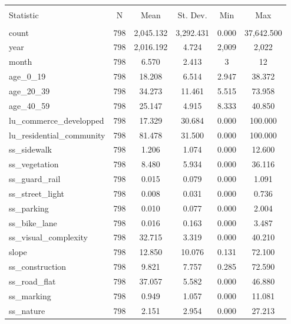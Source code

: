 
\begin{table}[!htbp] \centering 
  \caption{} 
  \label{} 
\begin{tabular}{@{\extracolsep{5pt}}lccccc} 
\\[-1.8ex]\hline 
\hline \\[-1.8ex] 
Statistic & \multicolumn{1}{c}{N} & \multicolumn{1}{c}{Mean} & \multicolumn{1}{c}{St. Dev.} & \multicolumn{1}{c}{Min} & \multicolumn{1}{c}{Max} \\ 
\hline \\[-1.8ex] 
count & 798 & 2,045.132 & 3,292.431 & 0.000 & 37,642.500 \\ 
year & 798 & 2,016.192 & 4.724 & 2,009 & 2,022 \\ 
month & 798 & 6.570 & 2.413 & 3 & 12 \\ 
age\_0\_19 & 798 & 18.208 & 6.514 & 2.947 & 38.372 \\ 
age\_20\_39 & 798 & 34.273 & 11.461 & 5.515 & 73.958 \\ 
age\_40\_59 & 798 & 25.147 & 4.915 & 8.333 & 40.850 \\ 
lu\_commerce\_developped & 798 & 17.329 & 30.684 & 0.000 & 100.000 \\ 
lu\_residential\_community & 798 & 81.478 & 31.500 & 0.000 & 100.000 \\ 
ss\_sidewalk & 798 & 1.206 & 1.074 & 0.000 & 12.600 \\ 
ss\_vegetation & 798 & 8.480 & 5.934 & 0.000 & 36.116 \\ 
ss\_guard\_rail & 798 & 0.015 & 0.079 & 0.000 & 1.091 \\ 
ss\_street\_light & 798 & 0.008 & 0.031 & 0.000 & 0.736 \\ 
ss\_parking & 798 & 0.010 & 0.077 & 0.000 & 2.004 \\ 
ss\_bike\_lane & 798 & 0.016 & 0.163 & 0.000 & 3.487 \\ 
ss\_visual\_complexity & 798 & 32.715 & 3.319 & 0.000 & 40.210 \\ 
slope & 798 & 12.850 & 10.076 & 0.131 & 72.100 \\ 
ss\_construction & 798 & 9.821 & 7.757 & 0.285 & 72.590 \\ 
ss\_road\_flat & 798 & 37.057 & 5.582 & 0.000 & 46.880 \\ 
ss\_marking & 798 & 0.949 & 1.057 & 0.000 & 11.081 \\ 
ss\_nature & 798 & 2.151 & 2.954 & 0.000 & 27.213 \\ 

\end{tabular}
\end{table}
